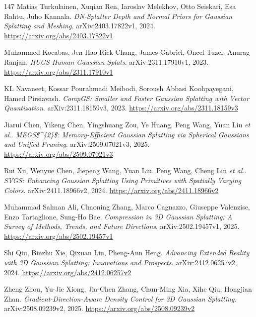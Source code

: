 \documentclass[11pt,a4paper]{article}
\begin{document}
\begin{thebibliography}{147}
Matias Turkulainen, Xuqian Ren, Iaroslav Melekhov, Otto Seiskari, Esa Rahtu, Juho Kannala.
\newblock \emph{DN-Splatter Depth and Normal Priors for Gaussian Splatting and Meshing}.
\newblock arXiv:2403.17822v1, 2024.
\newblock \url{https://arxiv.org/abs/2403.17822v1}

Muhammed Kocabas, Jen-Hao Rick Chang, James Gabriel, Oncel Tuzel, Anurag Ranjan.
\newblock \emph{HUGS Human Gaussian Splats}.
\newblock arXiv:2311.17910v1, 2023.
\newblock \url{https://arxiv.org/abs/2311.17910v1}

KL Navaneet, Kossar Pourahmadi Meibodi, Soroush Abbasi Koohpayegani, Hamed Pirsiavash.
\newblock \emph{CompGS: Smaller and Faster Gaussian Splatting with Vector Quantization}.
\newblock arXiv:2311.18159v3, 2023.
\newblock \url{https://arxiv.org/abs/2311.18159v3}

Jiarui Chen, Yikeng Chen, Yingshuang Zou, Ye Huang, Peng Wang, Yuan Liu \emph{et al.}.
\newblock \emph{MEGS\$\textasciicircum{}\{2\}\$: Memory-Efficient Gaussian Splatting via Spherical Gaussians and Unified Pruning}.
\newblock arXiv:2509.07021v3, 2025.
\newblock \url{https://arxiv.org/abs/2509.07021v3}

Rui Xu, Wenyue Chen, Jiepeng Wang, Yuan Liu, Peng Wang, Cheng Lin \emph{et al.}.
\newblock \emph{SVGS: Enhancing Gaussian Splatting Using Primitives with Spatially Varying Colors}.
\newblock arXiv:2411.18966v2, 2024.
\newblock \url{https://arxiv.org/abs/2411.18966v2}

Muhammad Salman Ali, Chaoning Zhang, Marco Cagnazzo, Giuseppe Valenzise, Enzo Tartaglione, Sung-Ho Bae.
\newblock \emph{Compression in 3D Gaussian Splatting: A Survey of Methods, Trends, and Future Directions}.
\newblock arXiv:2502.19457v1, 2025.
\newblock \url{https://arxiv.org/abs/2502.19457v1}

Shi Qiu, Binzhu Xie, Qixuan Liu, Pheng-Ann Heng.
\newblock \emph{Advancing Extended Reality with 3D Gaussian Splatting: Innovations and Prospects}.
\newblock arXiv:2412.06257v2, 2024.
\newblock \url{https://arxiv.org/abs/2412.06257v2}

Zheng Zhou, Yu-Jie Xiong, Jia-Chen Zhang, Chun-Ming Xia, Xihe Qiu, Hongjian Zhan.
\newblock \emph{Gradient-Direction-Aware Density Control for 3D Gaussian Splatting}.
\newblock arXiv:2508.09239v2, 2025.
\newblock \url{https://arxiv.org/abs/2508.09239v2}


\end{thebibliography}
\end{document}
